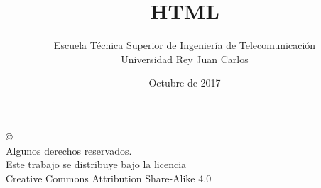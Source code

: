 \documentclass[ucs]{beamer}
\begin{document}
\title[HTML]{HTML }
\author[GSyC]{Escuela Técnica Superior de Ingeniería de Telecomunicación\\
Universidad Rey Juan Carlos}
\date[2017]{Octubre de 2017}


\begin{frame}
  \titlepage
\end{frame}



\begin{frame}[b]
\begin{flushright}
{\tiny
\copyright \insertshortdate~\insertshortauthor \\
  Algunos derechos reservados. \\
  Este trabajo se distribuye bajo la licencia \\
  Creative Commons Attribution Share-Alike 4.0\\
}
\end{flushright}  
\end{frame}







\end{document}
